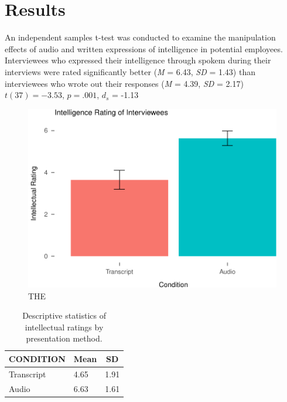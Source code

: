 \documentclass[man]{apa6}
\begin{document}
\hypertarget{results}{%
\section{Results}\label{results}}

An independent samples t-test was conducted to examine the manipulation effects of audio and written expressions of intelligence in potential employees. Interviewees who expressed their intelligence through spokem during their interviews were rated significantly better (\emph{M} = 6.43, \emph{SD} = 1.43) than interviewees who wrote out their responses (\emph{M} = 4.39, \emph{SD} = 2.17) \(t(37) = -3.53\), \(p = .001\), \(d_{s}\) = -1.13

\begin{figure}
\centering
\includegraphics{SchroederEpley2015_files/figure-latex/f1-1.pdf}
\caption{\label{fig:f1}THE}
\end{figure}

\begin{table}[tbp]
\begin{center}
\begin{threeparttable}
\caption{\label{tab:rt}Descriptive statistics of intellectual ratings by presentation method.}
\begin{tabular}{lll}
\toprule
CONDITION & \multicolumn{1}{c}{Mean} & \multicolumn{1}{c}{SD}\\
\midrule
Transcript & 4.65 & 1.91\\
Audio & 6.63 & 1.61\\
\bottomrule
\end{tabular}
\end{threeparttable}
\end{center}
\end{table}
\end{document}
